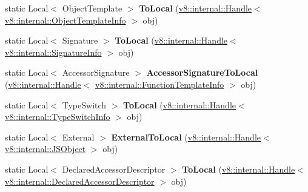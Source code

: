 \begin{DoxyCompactItemize}
\item 
\hypertarget{classv8_1_1_utils_aaf6cbfcde80e059e2a912e398709541a}{}static Local$<$ Object\+Template $>$ {\bfseries To\+Local} (\hyperlink{classv8_1_1internal_1_1_handle}{v8\+::internal\+::\+Handle}$<$ \hyperlink{classv8_1_1internal_1_1_object_template_info}{v8\+::internal\+::\+Object\+Template\+Info} $>$ obj)\label{classv8_1_1_utils_aaf6cbfcde80e059e2a912e398709541a}

\item 
\hypertarget{classv8_1_1_utils_a12dac6512de01f65d3858a85d5b06ab3}{}static Local$<$ Signature $>$ {\bfseries To\+Local} (\hyperlink{classv8_1_1internal_1_1_handle}{v8\+::internal\+::\+Handle}$<$ \hyperlink{classv8_1_1internal_1_1_signature_info}{v8\+::internal\+::\+Signature\+Info} $>$ obj)\label{classv8_1_1_utils_a12dac6512de01f65d3858a85d5b06ab3}

\item 
\hypertarget{classv8_1_1_utils_a7778219dad0e548e442cbd5d98f79f4a}{}static Local$<$ Accessor\+Signature $>$ {\bfseries Accessor\+Signature\+To\+Local} (\hyperlink{classv8_1_1internal_1_1_handle}{v8\+::internal\+::\+Handle}$<$ \hyperlink{classv8_1_1internal_1_1_function_template_info}{v8\+::internal\+::\+Function\+Template\+Info} $>$ obj)\label{classv8_1_1_utils_a7778219dad0e548e442cbd5d98f79f4a}

\item 
\hypertarget{classv8_1_1_utils_a7be2d2f9415424cc72ef346dde347f2d}{}static Local$<$ Type\+Switch $>$ {\bfseries To\+Local} (\hyperlink{classv8_1_1internal_1_1_handle}{v8\+::internal\+::\+Handle}$<$ \hyperlink{classv8_1_1internal_1_1_type_switch_info}{v8\+::internal\+::\+Type\+Switch\+Info} $>$ obj)\label{classv8_1_1_utils_a7be2d2f9415424cc72ef346dde347f2d}

\item 
\hypertarget{classv8_1_1_utils_aa043b78045a591d4a6d99b89b070bc28}{}static Local$<$ External $>$ {\bfseries External\+To\+Local} (\hyperlink{classv8_1_1internal_1_1_handle}{v8\+::internal\+::\+Handle}$<$ \hyperlink{classv8_1_1internal_1_1_j_s_object}{v8\+::internal\+::\+J\+S\+Object} $>$ obj)\label{classv8_1_1_utils_aa043b78045a591d4a6d99b89b070bc28}

\item 
\hypertarget{classv8_1_1_utils_a660509b20cad862823ffb8cd0b53d5d0}{}static Local$<$ Declared\+Accessor\+Descriptor $>$ {\bfseries To\+Local} (\hyperlink{classv8_1_1internal_1_1_handle}{v8\+::internal\+::\+Handle}$<$ \hyperlink{classv8_1_1internal_1_1_declared_accessor_descriptor}{v8\+::internal\+::\+Declared\+Accessor\+Descriptor} $>$ obj)\label{classv8_1_1_utils_a660509b20cad862823ffb8cd0b53d5d0}


\end{DoxyCompactItemize}
